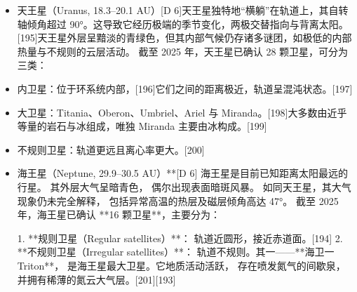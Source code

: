 \begin{itemize}
\item 天王星（Uranus, 18.3–20.1 AU）[D 6]天王星独特地“横躺”在轨道上，其自转轴倾角超过 90°。这导致它经历极端的季节变化，两极交替指向与背离太阳。[195]天王星外层呈黯淡的青绿色，但其内部气候仍存诸多谜团，如极低的内部热量与不规则的云层活动。  
截至 2025 年，天王星已确认 28 颗卫星，可分为三类：  
\item 内卫星：位于环系统内部，[196]它们之间的距离极近，轨道呈混沌状态。[197]  
\item 大卫星：Titania、Oberon、Umbriel、Ariel 与 Miranda。[198]大多数由近乎等量的岩石与冰组成，唯独 Miranda 主要由冰构成。[199]  
\item 不规则卫星：轨道更远且离心率更大。[200]  
\end{itemize}


\begin{itemize}
\item 海王星（Neptune, 29.9–30.5 AU）**[D 6]  
海王星是目前已知距离太阳最远的行星。  
其外层大气呈暗青色，  
偶尔出现表面暗斑风暴。  
如同天王星，其大气现象仍未完全解释，  
包括异常高温的热层及磁层倾角高达 47°。  
截至 2025 年，海王星已确认 **16 颗卫星**，主要分为：  

1. **规则卫星（Regular satellites）**：  
   轨道近圆形，接近赤道面。[194]  
2. **不规则卫星（Irregular satellites）**：  
   轨道不规则。其一——**海卫一 Triton**，  
   是海王星最大卫星。它地质活动活跃，  
   存在喷发氮气的间歇泉，  
   并拥有稀薄的氮云大气层。[201][193]
\end{itemize}




